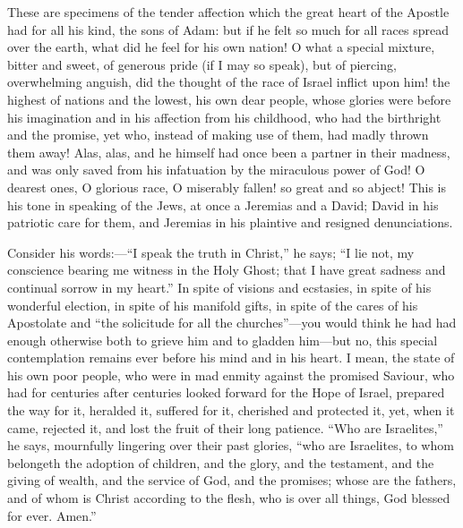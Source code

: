 These are specimens of the tender affection which the
great heart of the Apostle had for all his kind, the sons
of Adam: but if he felt so much for all races spread over
the earth, what did he feel for his own nation! O what a
special mixture, bitter and sweet, of generous pride (if
I may so speak), but of piercing, overwhelming anguish,
did the thought of the race of Israel inflict upon him!
the highest of nations and the lowest, his own dear
people, whose glories were before his imagination and in
his affection from his childhood, who had the birthright
and the promise, yet who, instead of making use of them,
had madly thrown them away! Alas, alas, and he himself
had once been a partner in their madness, and was only
saved from his infatuation by the miraculous power of
God! O dearest ones, O glorious race, O miserably fallen!
so great and so abject! This is his tone in speaking of
the Jews, at once a Jeremias and a David; David in his
patriotic care for them, and Jeremias in his plaintive
and resigned denunciations.

Consider his words:—``I speak the truth in
Christ,'' he says; ``I lie not, my conscience bearing
me witness in the Holy Ghost; that I have great sadness
and continual sorrow in my heart.'' In spite of
visions and ecstasies, in spite of his wonderful
election, in spite of his manifold gifts, in spite of the
cares of his Apostolate and ``the solicitude for all
the churches''—you would think he had had enough
otherwise both to grieve him and to gladden him—but
no, this special contemplation remains ever before his
mind and in his heart. I mean, the state of his own poor
people, who were in mad enmity against the promised
Saviour, who had for centuries after centuries looked
forward for the Hope of Israel, prepared the way for it,
heralded it, suffered for it, cherished and protected it,
yet, when it came, rejected it, and lost the fruit of
their long patience. ``Who are Israelites,'' he
says, mournfully lingering over their past glories,
``who are Israelites, to whom belongeth the adoption
of children, and the glory, and the testament, and the
giving of wealth, and the service of God, and the
promises; whose are the fathers, and of whom is Christ
according to the flesh, who is over all things, God
blessed for ever. Amen.''

